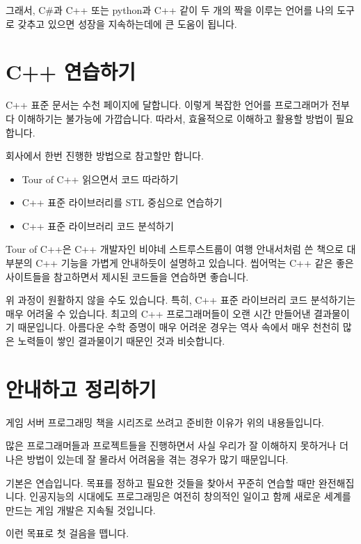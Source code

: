 그래서, C\#과 C++ 또는 python과 C++ 같이 두 개의 짝을 이루는 언어를 나의 도구로 갖추고 
있으면 성장을 지속하는데에 큰 도움이 됩니다. 

\section{C++ 연습하기}

C++ 표준 문서는 수천 페이지에 달합니다. 이렇게 복잡한 언어를 프로그래머가 전부 다 
이해하기는 불가능에 가깝습니다. 따라서, 효율적으로 이해하고 활용할 방법이 필요합니다. 

회사에서 한번 진행한 방법으로 참고할만 합니다. 

\begin{itemize}
    \item Tour of C++ 읽으면서 코드 따라하기 
    \item C++ 표준 라이브러리를 STL 중심으로 연습하기 
    \item C++ 표준 라이브러리 코드 분석하기 
\end{itemize}

Tour of C++은 C++ 개발자인 비야네 스트루스트룹이 여행 안내서처럼 쓴 책으로 대부분의 
C++ 기능을 가볍게 안내하듯이 설명하고 있습니다. 씹어먹는 C++ 같은 좋은 사이트들을 
참고하면서 제시된 코드들을 연습하면 좋습니다. 

위 과정이 원활하지 않을 수도 있습니다. 특히, C++ 표준 라이브러리 코드 분석하기는 매우 
어려울 수 있습니다. 최고의 C++ 프로그래머들이 오랜 시간 만들어낸 결과물이기 때문입니다. 
아름다운 수학 증명이 매우 어려운 경우는 역사 속에서 매우 천천히 많은 노력들이 쌓인 
결과물이기 때문인 것과 비슷합니다. 


\section{안내하고 정리하기}

게임 서버 프로그래밍 책을 시리즈로 쓰려고 준비한 이유가 위의 내용들입니다. 

많은 프로그래머들과 프로젝트들을 진행하면서 사실 우리가 잘 이해하지 못하거나 
더 나은 방법이 있는데 잘 몰라서 어려움을 겪는 경우가 많기 때문입니다. 

기본은 연습입니다. 목표를 정하고 필요한 것들을 찾아서 꾸준히 연습할 때만 
완전해집니다. 인공지능의 시대에도 프로그래밍은 여전히 창의적인 일이고 
함께 새로운 세계를 만드는 게임 개발은 지속될 것입니다. 

이런 목표로 첫 걸음을 뗍니다. 










